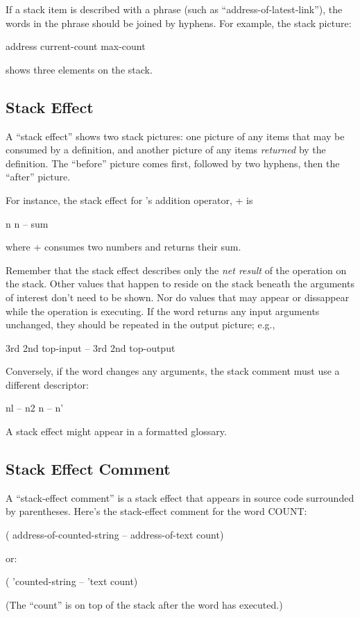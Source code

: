 If a stack item is described with a phrase (such as ``address-of-latest-link''),
the words in the phrase should be joined by hyphens.  For
example, the stack picture:
\begin{Code}
address current-count max-count
\end{Code}
shows three elements on the stack.

\subsection{Stack Effect}

A ``stack effect'' shows two stack pictures: one picture of any items that
may be consumed by a definition, and another picture of any items
\emph{returned} by the definition.  The ``before'' picture comes first, followed by
two hyphens, then the ``after'' picture.

For instance, the stack effect for \Forth{}'s addition operator, + is
\begin{Code}
n n -- sum
\end{Code}
where + consumes two numbers and returns their sum.

Remember that the stack effect describes only the \emph{net result} of the
operation on the stack.  Other values that happen to reside on the stack
beneath the arguments of interest don't need to be shown.  Nor do values
that may appear or dissappear while the operation is executing.
If the word returns any input arguments unchanged, they should be
repeated in the output picture; e.g.,
\begin{Code}
3rd 2nd top-input -- 3rd 2nd top-output
\end{Code}
Conversely, if the word changes any arguments, the stack comment must
use a different descriptor:
\begin{Code}
nl -- n2
n -- n'
\end{Code}
A stack effect might appear in a formatted glossary.

\subsection{Stack Effect Comment}

A ``stack-effect comment'' is a stack effect that appears in source code
surrounded by parentheses.  Here's the stack-effect comment for the word
COUNT:
\begin{Code}
( address-of-counted-string -- address-of-text count)
\end{Code}
or:
\begin{Code}
( 'counted-string -- 'text count)
\end{Code}
(The ``count'' is on top of the stack after the word has executed.)

